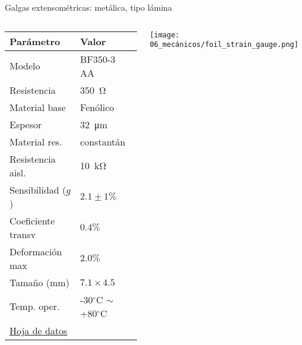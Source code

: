 \documentclass[aspectratio=169]{beamer}
\begin{document}
\begin{frame}{Galgas extensométricas: metálica, tipo lámina}
    \begin{columns}[c, onlytextwidth]
        \begin{column}{0.55\textwidth}
            \begin{tabular}{ll}
            \toprule
            \textbf{Parámetro} & \textbf{Valor} \\
            \midrule
            Modelo & BF350-3 AA \\
            Resistencia & \SI{350}{\ohm} \\
            Material base & Fenólico \\
            Espesor & \SI{32}{\micro\meter} \\
            Material res. & constantán \\
            Resistencia aisl. & \SI{10}{\kilo\ohm}\\
            Sensibilidad ($g$) & $2.1 \pm 1\%$\\
            Coeficiente transv & $0.4\%$ \\
            Deformación max & $2.0\%$ \\
            Tamaño ($\si{\milli\meter}$) & $7.1 \times 4.5$ \\
            Temp. oper. & -30$^\circ$C $\sim$ +80$^\circ$C \\
            \bottomrule
            {\footnotesize \href{https://www.elumiled.com/datasheets/BF350-3AA.pdf}{Hoja de datos}}
            \end{tabular}
        \end{column}
        \begin{column}{0.45\textwidth}
        \centering
        \texttt{[image: 06\_mecánicos/foil\_strain\_gauge.png]}
        \end{column}
    \end{columns}
\end{frame}
\end{document}

